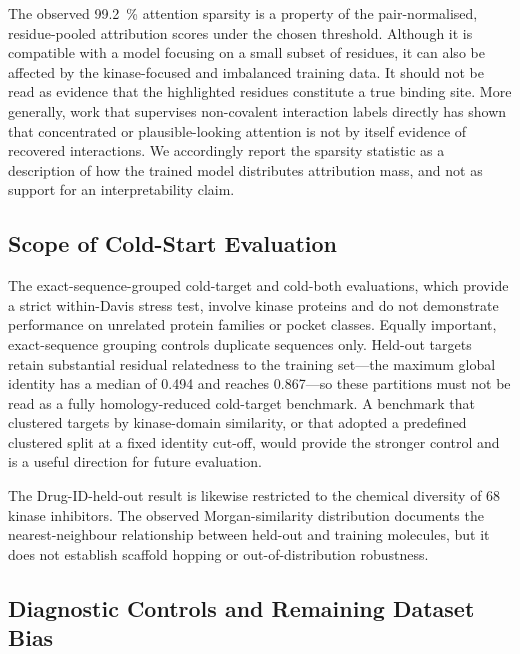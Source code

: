 \documentclass[fleqn,10pt]{wlscirep}
\begin{document}
The observed \SI{99.2}{\percent} attention sparsity is a property of the
pair-normalised, residue-pooled attribution scores under the chosen threshold. Although it is
compatible with a model focusing on a small subset of residues, it can also be
affected by the kinase-focused and imbalanced training data.  It should not be
read as evidence that the highlighted residues constitute a true binding site.
More generally, work that supervises non-covalent interaction labels directly
has shown that concentrated or plausible-looking attention is not by itself
evidence of recovered
interactions.\cite{li2020monn,gim2023arkdta,seo2024blendnet}  We accordingly
report the sparsity statistic as a description of how the trained model
distributes attribution mass, and not as support for an interpretability claim.

\subsection{Scope of Cold-Start Evaluation}

The exact-sequence-grouped cold-target and cold-both evaluations, which provide
a strict within-Davis stress test, involve kinase proteins and do not
demonstrate performance on unrelated protein families or pocket classes.
Equally important, exact-sequence grouping controls duplicate sequences only.
Held-out targets retain substantial residual relatedness to the training
set---the maximum global identity has a median of 0.494 and reaches 0.867---so
these partitions must not be read as a fully homology-reduced cold-target
benchmark.  A benchmark that clustered targets by kinase-domain similarity, or
that adopted a predefined clustered split at a fixed identity cut-off, would
provide the stronger control and is a useful direction for future evaluation.

The Drug-ID-held-out result is likewise restricted to the chemical diversity of 68
kinase inhibitors.  The observed Morgan-similarity distribution documents the
nearest-neighbour relationship between held-out and training molecules, but it
does not establish scaffold hopping or out-of-distribution robustness.

\subsection{Diagnostic Controls and Remaining Dataset Bias}
\end{document}
